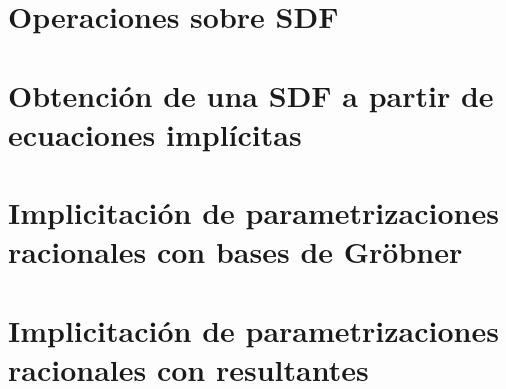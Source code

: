 \section{Operaciones sobre SDF}\label{sec:operaciones}


\section{Obtención de una SDF a partir de ecuaciones implícitas}\label{sec:aprox}


\section{Implicitación de parametrizaciones racionales con bases de Gröbner}


\section{Implicitación de parametrizaciones racionales con resultantes}





